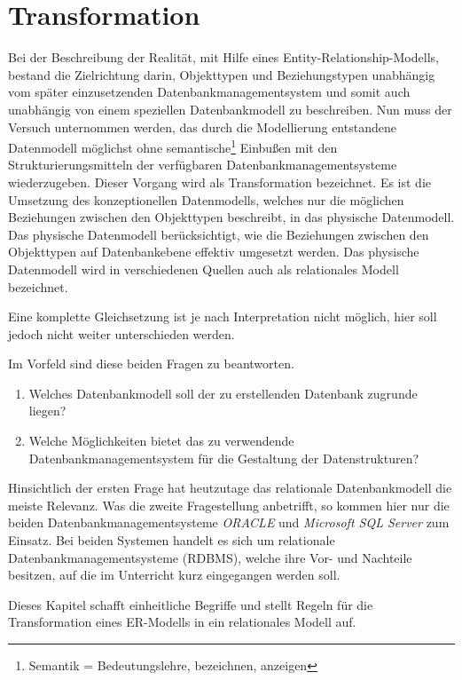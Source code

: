 	\chapter{Transformation}
    \setcounter{page}{1}
    \minitoc
\newpage
    Bei der Beschreibung der Realit\"at, mit Hilfe eines Entity-Relationship-Modells, bestand die Zielrichtung darin, Objekttypen und Beziehungstypen unabh\"angig vom sp\"ater einzusetzenden Datenbankmanagementsystem und somit auch unabh\"angig von einem speziellen Datenbankmodell zu beschreiben. Nun muss der Versuch unternommen werden, das durch die Modellierung entstandene Datenmodell m\"oglichst ohne semantische\footnote{Semantik = Bedeutungslehre, bezeichnen, anzeigen} Einbu\ss en mit den Strukturierungsmitteln der verf\"ugbaren Datenbankmanagementsysteme wiederzugeben. Dieser Vorgang wird als Transformation bezeichnet. Es ist die Umsetzung des konzeptionellen Datenmodells, welches nur die m\"oglichen Beziehungen zwischen den Objekttypen beschreibt, in das physische Datenmodell. Das physische Datenmodell ber\"ucksichtigt, wie die Beziehungen zwischen den Objekttypen auf Datenbankebene effektiv umgesetzt werden. Das physische Datenmodell wird in verschiedenen Quellen auch als relationales Modell
bezeichnet.

    Eine komplette Gleichsetzung ist je nach Interpretation nicht m\"oglich, hier soll jedoch nicht weiter unterschieden werden.

    Im Vorfeld sind diese beiden Fragen zu beantworten.
    \begin{enumerate}
      \item Welches Datenbankmodell soll der zu erstellenden Datenbank zugrunde liegen?
      \item Welche M\"oglichkeiten bietet das zu verwendende Datenbankmanagementsystem f\"ur die Gestaltung der Datenstrukturen?
    \end{enumerate}
    Hinsichtlich der ersten Frage hat heutzutage das relationale Datenbankmodell die meiste Relevanz. Was die zweite Fragestellung anbetrifft, so kommen hier nur die beiden Datenbankmanagementsysteme \textit{ORACLE} und \textit{Microsoft SQL Server} zum Einsatz. Bei beiden Systemen handelt es sich um relationale Datenbankmanagementsysteme (RDBMS), welche ihre Vor- und Nachteile besitzen, auf die im Unterricht kurz eingegangen werden soll.

    Dieses Kapitel schafft einheitliche Begriffe und stellt Regeln f\"ur die Transformation eines ER-Modells in ein relationales Modell auf.
\clearpage
